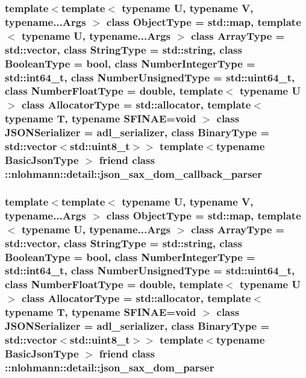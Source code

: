 \subsubsection[{\texorpdfstring{\+::nlohmann\+::detail\+::json\+\_\+sax\+\_\+dom\+\_\+callback\+\_\+parser}{::nlohmann::detail::json_sax_dom_callback_parser}}]{\setlength{\rightskip}{0pt plus 5cm}template$<$template$<$ typename U, typename V, typename...\+Args $>$ class Object\+Type = std\+::map, template$<$ typename U, typename...\+Args $>$ class Array\+Type = std\+::vector, class String\+Type  = std\+::string, class Boolean\+Type  = bool, class Number\+Integer\+Type  = std\+::int64\+\_\+t, class Number\+Unsigned\+Type  = std\+::uint64\+\_\+t, class Number\+Float\+Type  = double, template$<$ typename U $>$ class Allocator\+Type = std\+::allocator, template$<$ typename T, typename S\+F\+I\+N\+A\+E=void $>$ class J\+S\+O\+N\+Serializer = adl\+\_\+serializer, class Binary\+Type  = std\+::vector$<$std\+::uint8\+\_\+t$>$$>$ template$<$typename Basic\+Json\+Type $>$ friend class \+::{\bf nlohmann\+::detail\+::json\+\_\+sax\+\_\+dom\+\_\+callback\+\_\+parser}\hspace{0.3cm}{\ttfamily [friend]}}\hypertarget{classnlohmann_1_1basic__json_a95574da8d12905ea99dc348934c837da}{}\label{classnlohmann_1_1basic__json_a95574da8d12905ea99dc348934c837da}
\subsubsection[{\texorpdfstring{\+::nlohmann\+::detail\+::json\+\_\+sax\+\_\+dom\+\_\+parser}{::nlohmann::detail::json_sax_dom_parser}}]{\setlength{\rightskip}{0pt plus 5cm}template$<$template$<$ typename U, typename V, typename...\+Args $>$ class Object\+Type = std\+::map, template$<$ typename U, typename...\+Args $>$ class Array\+Type = std\+::vector, class String\+Type  = std\+::string, class Boolean\+Type  = bool, class Number\+Integer\+Type  = std\+::int64\+\_\+t, class Number\+Unsigned\+Type  = std\+::uint64\+\_\+t, class Number\+Float\+Type  = double, template$<$ typename U $>$ class Allocator\+Type = std\+::allocator, template$<$ typename T, typename S\+F\+I\+N\+A\+E=void $>$ class J\+S\+O\+N\+Serializer = adl\+\_\+serializer, class Binary\+Type  = std\+::vector$<$std\+::uint8\+\_\+t$>$$>$ template$<$typename Basic\+Json\+Type $>$ friend class \+::{\bf nlohmann\+::detail\+::json\+\_\+sax\+\_\+dom\+\_\+parser}\hspace{0.3cm}{\ttfamily [friend]}}\hypertarget{classnlohmann_1_1basic__json_a47aabb1eceae32e8a6e8e7f0ff34be60}{}\label{classnlohmann_1_1basic__json_a47aabb1eceae32e8a6e8e7f0ff34be60}
